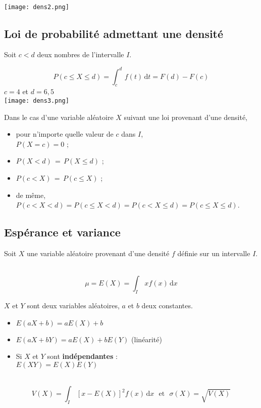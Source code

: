 \documentclass[a4paper,11pt]{article} \usepackage{FBarticle} \mapage{831}{Probabilités 2} %
\begin{document}
\begin{multicols}{2}
\exem \\
\texttt{[image: dens2.png]}

\subsection{Loi de probabilité admettant une densité}
Soit $c<d$ deux nombres de l'intervalle $I$.\\

$$P(c\leq X\leq d)=\int_c^d\,f(t)\,\textrm{d}t=F(d)-F(c)$$
\exem $c=4$ et $d=6,\!5$\\
\texttt{[image: dens3.png]}\par

\rema Dans le cas d'une variable aléatoire $X$ suivant une loi provenant d'une densité, 
\begin{itemize}
\item  pour n'importe quelle valeur de $c$ dans $I$,\\ $P(X=c)=0$ ;
\item $P(X<d)\,=\,P(X\leq d)$ ;
\item $P(c<X)\,=\,P(c\leq X)$ ;
\item de même, \\
	$P(c<X<d)=P(c\leq X <d)=P(c<X\leq d)=P(c\leq X\leq d)$.
\end{itemize}

\subsection{Espérance et variance}
Soit $X$ une variable aléatoire provenant d'une densité $f$ définie sur un intervalle $I$.\par

\\
$$\mu=E(X)=\int_I\,xf(x)\,\textrm{d}x$$

\prop$X$ et $Y$ sont deux variables aléatoires, $a$ et $b$ deux constantes.
 \begin{itemize}
\item $E(aX+b)=aE(X)+b$
\item $E(aX+bY)=aE(X)+bE(Y)$ (linéarité)
\item Si $X$ et $Y$ sont \textbf{indépendantes} :\\
$E(XY)=E(X)E(Y)$\\
\end{itemize}

\\
$$V(X)=\int_I\,\left[x-E(X)\right]^2f(x)\,\textrm{d}x~~~\textrm{et}~~~\sigma(X)=\sqrt{V(X)}$$


\end{multicols}
\end{document}
